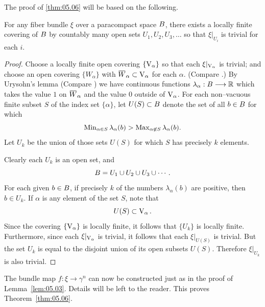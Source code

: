 \documentclass[../main]{subfiles}
\begin{document}
The proof of \ref{thm:05.06} will be based on the following.
\setcounter{theorem}{8}
\begin{lemma}\label{lem:05.09}
For any fiber bundle $\xi$ over a paracompact space $B$, there exists a locally finite covering of $B$ by countably many open sets $U_1, U_2, U_3, \ldots$ so that $\xi |_{U_i}$ is trivial for each $i$. 
\end{lemma}

\begin{proof}
Choose a locally finite open covering $\{\operatorname{V}_\alpha\}$ so that each $\xi |_{\operatorname{V}_\alpha}$ is trivial; and choose an open covering $\{W_\alpha\}$ with ${\xoverline W}_\alpha \subset \StiefelManifold_\alpha$ for each $\alpha$. (Compare \cite[p. 171]{kelley1955}.) By Urysohn's lemma (Compare \cite[\S33]{munkres2000topology}) we have continuous functions $\lambda_\alpha : B \longrightarrow \mathbb R$ which takes the value $1$ on ${\xoverline W}_\alpha$ and the value $0$ outside of $\operatorname{V}_\alpha$. For each non--vacuous finite subset $S$ of the index set $\{\alpha\}$, let $U(S) \subset B$ denote the set of all $b \in B$ for which \[\operatorname{Min}_{\alpha \in S} \lambda_\alpha(b) > \operatorname{Max}_{\alpha \not \in S} \lambda_\alpha(b).\] Let $U_k$ be the union of those sets $U(S)$ for which $S$ has precisely $k$ elements.

Clearly each $U_k$ is an open set, and \[B = U_1 \cup U_2 \cup U_3 \cup \cdots.\] For each given $b \in B$, if precisely $k$ of the numbers $\lambda_\alpha(b)$ are positive, then $b \in U_k$. If $\alpha$ is any element of the set $S$, note that \[U(S) \subset \operatorname{V}_\alpha.\] Since the covering $\{\operatorname{V}_\alpha\}$ is locally finite, it follows that $\{U_k\}$ is locally finite. Furthermore, since each $\xi |_{\operatorname{V}_\alpha}$ is trivial, it follows that each $\xi |_{U(S)}$ is trivial. But the set $U_k$ is equal to the disjoint union of its open subsets $U(S)$. Therefore $\xi |_{U_k}$ is also trivial. 
\end{proof}

The bundle map $f : \xi \longrightarrow \gamma^n$ can now be constructed just as in the proof of Lemma~\ref{lem:05.03}. Details will be left to the reader. This proves Theorem~\ref{thm:05.06}. 
\end{document}
